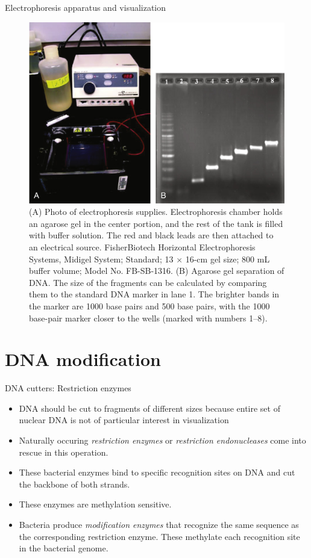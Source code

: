 \documentclass[
  ignorenonframetext,
  aspectratio=169]{beamer}
\providecommand{\tightlist}{%
  \setlength{\itemsep}{0pt}\setlength{\parskip}{0pt}}
\begin{document}
\begin{frame}{Electrophoresis apparatus and visualization}
\protect\hypertarget{electrophoresis-apparatus-and-visualization}{}
\begin{figure}
\includegraphics[width=0.45\linewidth]{./../images/electrophoresis} \caption{(A) Photo of electrophoresis supplies. Electrophoresis chamber holds an agarose gel in the center portion, and the rest of the tank is filled with buffer solution. The red and black leads are then attached to an electrical source. FisherBiotech Horizontal Electrophoresis Systems, Midigel System; Standard; 13 $\times$ 16-cm gel size; 800 mL buffer volume; Model No. FB-SB-1316. (B) Agarose gel separation of DNA. The size of the fragments can be calculated by comparing them to the standard DNA marker in lane 1. The brighter bands in the marker are 1000 base pairs and 500 base pairs, with the 1000 base-pair marker closer to the wells (marked with numbers 1–8).}\label{fig:gel-electrophoresis}
\end{figure}
\end{frame}

\hypertarget{dna-modification}{%
\section{DNA modification}\label{dna-modification}}

\begin{frame}{DNA cutters: Restriction enzymes}
\protect\hypertarget{dna-cutters-restriction-enzymes}{}
\begin{itemize}
\tightlist
\item
  DNA should be cut to fragments of different sizes because entire set
  of nuclear DNA is not of particular interest in visualization
\item
  Naturally occuring \emph{restriction enzymes} or \emph{restriction
  endonucleases} come into rescue in this operation.
\item
  These bacterial enzymes bind to specific recognition sites on DNA and
  cut the backbone of both strands.
\item
  These enzymes are methylation sensitive.
\item
  Bacteria produce \emph{modification enzymes} that recognize the same
  sequence as the corresponding restriction enzyme. These methylate each
  recognition site in the bacterial genome.
\end{itemize}
\end{frame}
\end{document}
